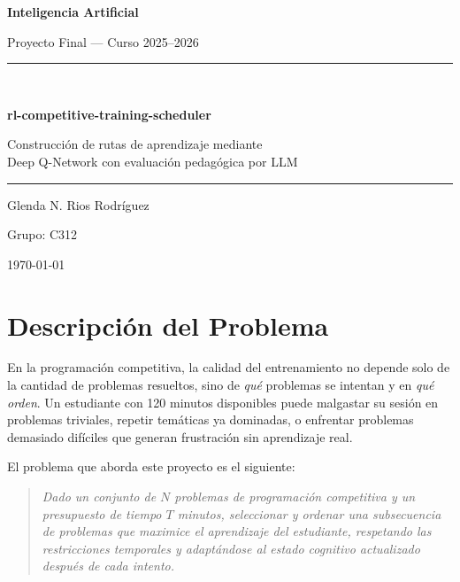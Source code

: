 \documentclass[12pt, a4paper]{article}
\begin{document}
\begin{titlepage}
  \centering
  \vspace*{2cm}
  {\Large \textbf{Inteligencia Artificial} \par}
  \vspace{0.3cm}
  {\large Proyecto Final --- Curso 2025--2026 \par}
  \vspace{2cm}
  \rule{\textwidth}{1pt}\\[0.5em]
  {\LARGE \textbf{rl-competitive-training-scheduler} \par}
  \vspace{0.4cm}
  {\large Construcción de rutas de aprendizaje mediante\\
  Deep Q-Network con evaluación pedagógica por LLM \par}
  \rule{\textwidth}{1pt}
  \vspace{3cm}
  {\large Glenda N. Rios Rodríguez \par}
  \vspace{0.2cm}
  {\normalsize Grupo: C312 \par}
  \vspace{0.5cm}
  \vfill
  {\large \today \par}
\end{titlepage}

\tableofcontents
\newpage

\section{Descripción del Problema}
 
En la programación competitiva, la calidad del entrenamiento no depende solo de
la cantidad de problemas resueltos, sino de \textit{qué} problemas se intentan y
en \textit{qué orden}. Un estudiante con 120 minutos disponibles puede malgastar
su sesión en problemas triviales, repetir temáticas ya dominadas, o enfrentar
problemas demasiado difíciles que generan frustración sin aprendizaje real.
 
El problema que aborda este proyecto es el siguiente:
 
\begin{quote}
\textit{Dado un conjunto de $N$ problemas de programación competitiva y un
presupuesto de tiempo $T$ minutos, seleccionar y ordenar una subsecuencia de
problemas que maximice el aprendizaje del estudiante, respetando las restricciones
temporales y adaptándose al estado cognitivo actualizado después de cada intento.}
\end{quote}
 
\end{document}

